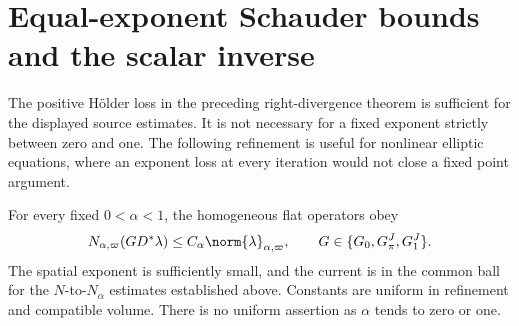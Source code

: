 \section{Equal-exponent Schauder bounds and the scalar inverse}
\label{ss-section}

The positive H\"older loss in the preceding right-divergence
theorem is sufficient for the displayed source estimates. It is
not necessary for a fixed exponent strictly between zero and one.
The following refinement is useful for nonlinear elliptic equations,
where an exponent loss at every iteration would not close a fixed
point argument.

\begin{theorem}\label{ss-equal-exponent}
For every fixed $0<\alpha<1$, the homogeneous flat operators obey
\begin{equation}\label{ss-main}
 N_{\alpha,\varpi}(GD^*\lambda)
       \le C_\alpha\norm{\lambda}_{\alpha,\varpi},
 \qquad G\in\{G_0,G_\pi^J,G_1^J\}.
\end{equation}
The spatial exponent is sufficiently small, and the current is in
the common ball for the $N$-to-$N_\alpha$ estimates established
above. Constants are uniform in refinement and compatible volume.
There is no uniform assertion as $\alpha$ tends to zero or one.
\end{theorem}

